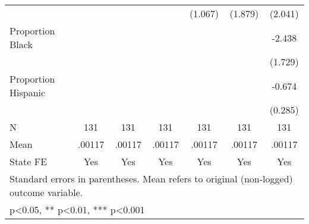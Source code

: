 {\begin{tabular}{l*{6}{c}}
                    &                     &                     &                     &     (1.067)         &     (1.879)         &     (2.041)         \\
\addlinespace
Proportion Black    &                     &                     &                     &                     &                     &      -2.438         \\
                    &                     &                     &                     &                     &                     &     (1.729)         \\
\addlinespace
Proportion Hispanic &                     &                     &                     &                     &                     &      -0.674\sym{*}  \\
                    &                     &                     &                     &                     &                     &     (0.285)         \\
\midrule
N                   &         131         &         131         &         131         &         131         &         131         &         131         \\
Mean                &      .00117         &      .00117         &      .00117         &      .00117         &      .00117         &      .00117         \\
State FE            &         Yes         &         Yes         &         Yes         &         Yes         &         Yes         &         Yes         \\
\bottomrule
\multicolumn{7}{l}{\footnotesize Standard errors in parentheses. Mean refers to original (non-logged) outcome variable.}\\
\multicolumn{7}{l}{\footnotesize * p<0.05, ** p<0.01, *** p<0.001}\\
\end{tabular}
}
